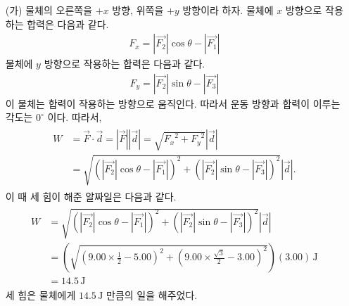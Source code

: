 \documentclass[floatfix,nofootinbib,superscriptaddress,fleqn,preprint]{revtex4}
\begin{document}
\begin{itemize}
  \item [(가)] 물체의 오른쪽을 $+x$ 방향, 위쪽을 $+y$ 방향이라 하자.
   물체에 $x$ 방향으로 작용하는 합력은 다음과 같다.
   \begin{align}
     F_x =|\vec{F_2}|\cos{\theta}-|\vec{F_1}|
   \end{align}
   물체에 $y$ 방향으로 작용하는 합력은 다음과 같다.
   \begin{align}
      F_y =|\vec{F_2}|\sin{\theta}-|\vec{F_3}|
   \end{align}
   이 물체는 합력이 작용하는 방향으로 움직인다. 따라서 운동 방향과 합력이 이루는 각도는 
   $0^\circ$ 이다. 따라서, 
   \begin{align}
    \begin{split}
      W &= \vec{F}\cdot\vec{d}=\left|\vec{F}\right||\vec{d}|
      =\sqrt{{F_x}^2+{F_y}^2}|\vec{d}|  \\
      &=\sqrt{\left(|\vec{F_2}|\cos{\theta}
      -|\vec{F_1}|\right)^2+\left(|\vec{F_2}|\sin{\theta}
      -|\vec{F_3}|\right)^2}|\vec{d}|.
    \end{split}
  \end{align}
  이 때 세 힘이 해준 알짜일은 다음과 같다.
  \begin{align}
    \begin{split}
      W&=\sqrt{\left(|\vec{F_2}|\cos{\theta}
      -|\vec{F_1}|\right)^2+\left(|\vec{F_2}|\sin{\theta}
      -|\vec{F_3}|\right)^2}|\vec{d}| \\
      &= \left( \sqrt{\left(9.00\times\frac{1}{2}
      -5.00\right)^2+\left(9.00\times\frac{\sqrt{3}}{2}
      -3.00\right)^2 }\right)(3.00)\,\mathrm{J} \\
      &=14.5\,\mathrm{J}
    \end{split}
    \end{align}
    세 힘은 물체에게 $14.5\,\mathrm{J}$ 만큼의 일을 해주었다.

\end{itemize}
\end{document}
